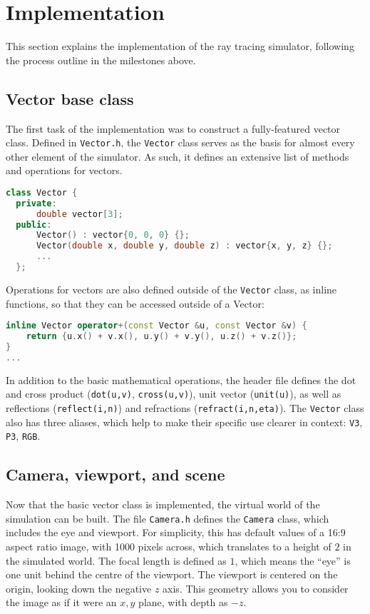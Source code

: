 \documentclass[a4paper]{article}
\begin{document}
\section{Implementation}
This section explains the implementation of the ray tracing simulator, following the process outline in the milestones above.

\subsection{Vector base class}
The first task of the implementation was to construct a fully-featured vector class. Defined in \verb|Vector.h|, the \verb|Vector| class serves as the basis for almost every other element of the simulator. As such, it defines an extensive list of methods and operations for vectors.

\begin{lstlisting}[language=C++, belowskip=-0.8 \baselineskip]
class Vector {
  private:
      double vector[3];
  public:
      Vector() : vector{0, 0, 0} {};
      Vector(double x, double y, double z) : vector{x, y, z} {};
      ...
  };
\end{lstlisting}Operations for vectors are also defined outside of the \verb|Vector| class, as inline functions, so that they can be accessed outside of a Vector:
\begin{lstlisting}[language=C++, belowskip=-0.8 \baselineskip]
inline Vector operator+(const Vector &u, const Vector &v) {
    return {u.x() + v.x(), u.y() + v.y(), u.z() + v.z()};
}
...
\end{lstlisting}In addition to the basic mathematical operations, the header file defines the dot and cross product (\verb|dot(u,v)|, \verb|cross(u,v)|), unit vector (\verb|unit(u)|), as well as reflections (\verb|reflect(i,n)|) and refractions (\verb|refract(i,n,eta)|). The \verb|Vector| class also has three aliases, which help to make their specific use clearer in context: \verb|V3|, \verb|P3|, \verb|RGB|.

\subsection{Camera, viewport, and scene}
Now that the basic vector class is implemented, the virtual world of the simulation can be built. The file \verb|Camera.h| defines the \verb|Camera| class, which includes the eye and viewport. For simplicity, this has default values of a 16:9 aspect ratio image, with 1000 pixels across, which translates to a height of $2$ in the simulated world. The focal length is defined as $1$, which means the ``eye'' is one unit behind the centre of the viewport. The viewport is centered on the origin, looking down the negative $z$ axis. This geometry allows you to consider the image as if it were an $x,y$ plane, with depth as $-z$. 
\end{document}
